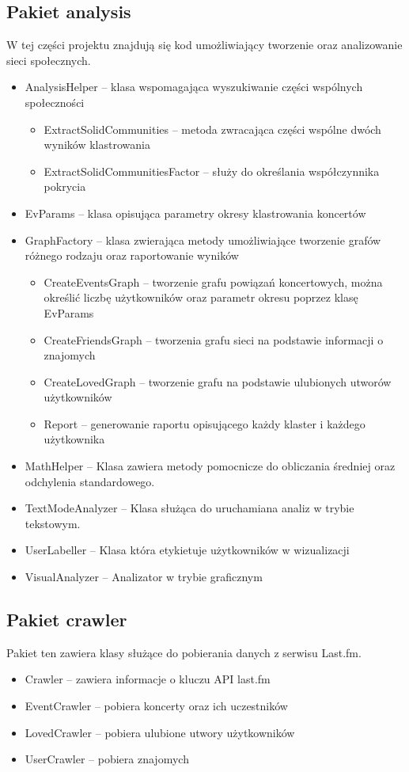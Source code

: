 \documentclass[10pt,a4paper,epic,carom]{article}
\begin{document}
\subsection{Pakiet analysis}
W tej części projektu znajdują się kod umożliwiający tworzenie oraz analizowanie sieci społecznych.
\begin{itemize}
\item AnalysisHelper – klasa wspomagająca wyszukiwanie części wspólnych społeczności
\begin{itemize}
\item ExtractSolidCommunities – metoda zwracająca części wspólne dwóch wyników klastrowania
\item ExtractSolidCommunitiesFactor – służy do określania współczynnika pokrycia
\end{itemize}
\item EvParams – klasa opisująca parametry okresy klastrowania koncertów
\item GraphFactory – klasa zwierająca metody umożliwiające tworzenie grafów różnego rodzaju oraz raportowanie wyników
\begin{itemize}
\item CreateEventsGraph – tworzenie grafu powiązań koncertowych, można określić liczbę użytkowników oraz parametr okresu poprzez klasę EvParams
\item CreateFriendsGraph – tworzenia grafu sieci na podstawie informacji o znajomych
\item CreateLovedGraph – tworzenie  grafu na podstawie ulubionych utworów użytkowników
\item Report – generowanie raportu opisującego każdy klaster i każdego użytkownika
\end{itemize}
\item MathHelper – Klasa zawiera metody pomocnicze do obliczania średniej oraz odchylenia standardowego.
\item TextModeAnalyzer – Klasa służąca do uruchamiana analiz w trybie tekstowym.
\item UserLabeller – Klasa która etykietuje użytkowników w wizualizacji
\item VisualAnalyzer – Analizator w trybie graficznym
\end{itemize}

\subsection{Pakiet crawler}
Pakiet ten zawiera klasy służące do pobierania danych z serwisu Last.fm.
\begin{itemize}
\item Crawler – zawiera informacje o kluczu API last.fm 
\item EventCrawler – pobiera koncerty oraz ich uczestników
\item LovedCrawler – pobiera ulubione utwory użytkowników
\item UserCrawler – pobiera znajomych
\end{itemize}
\end{document}
